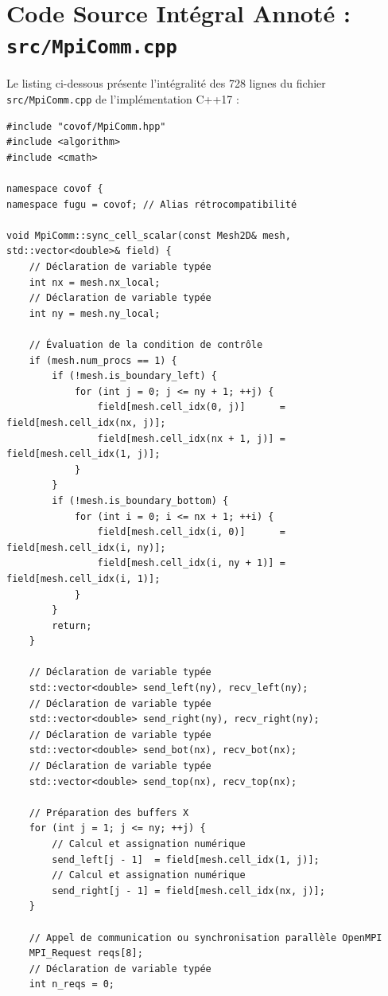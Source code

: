 \documentclass[10pt,a4paper,oneside]{book}
\begin{document}
\section{Code Source Intégral Annoté : \texttt{src/MpiComm.cpp}}
Le listing ci-dessous présente l'intégralité des 728 lignes du fichier \texttt{src/MpiComm.cpp} de l'implémentation C++17 :

\begin{lstlisting}[language={[11]C++}]
#include "covof/MpiComm.hpp"
#include <algorithm>
#include <cmath>

namespace covof {
namespace fugu = covof; // Alias rétrocompatibilité

void MpiComm::sync_cell_scalar(const Mesh2D& mesh, std::vector<double>& field) {
    // Déclaration de variable typée
    int nx = mesh.nx_local;
    // Déclaration de variable typée
    int ny = mesh.ny_local;

    // Évaluation de la condition de contrôle
    if (mesh.num_procs == 1) {
        if (!mesh.is_boundary_left) {
            for (int j = 0; j <= ny + 1; ++j) {
                field[mesh.cell_idx(0, j)]      = field[mesh.cell_idx(nx, j)];
                field[mesh.cell_idx(nx + 1, j)] = field[mesh.cell_idx(1, j)];
            }
        }
        if (!mesh.is_boundary_bottom) {
            for (int i = 0; i <= nx + 1; ++i) {
                field[mesh.cell_idx(i, 0)]      = field[mesh.cell_idx(i, ny)];
                field[mesh.cell_idx(i, ny + 1)] = field[mesh.cell_idx(i, 1)];
            }
        }
        return;
    }

    // Déclaration de variable typée
    std::vector<double> send_left(ny), recv_left(ny);
    // Déclaration de variable typée
    std::vector<double> send_right(ny), recv_right(ny);
    // Déclaration de variable typée
    std::vector<double> send_bot(nx), recv_bot(nx);
    // Déclaration de variable typée
    std::vector<double> send_top(nx), recv_top(nx);

    // Préparation des buffers X
    for (int j = 1; j <= ny; ++j) {
        // Calcul et assignation numérique
        send_left[j - 1]  = field[mesh.cell_idx(1, j)];
        // Calcul et assignation numérique
        send_right[j - 1] = field[mesh.cell_idx(nx, j)];
    }

    // Appel de communication ou synchronisation parallèle OpenMPI
    MPI_Request reqs[8];
    // Déclaration de variable typée
    int n_reqs = 0;


\end{lstlisting}
\end{document}
